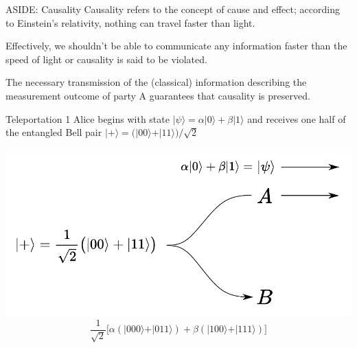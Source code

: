 \documentclass[11pt]{beamer}
\begin{document}
\begin{frame}{{\small ASIDE:} Causality}
Causality refers to the concept of cause and effect; according to Einstein's relativity, nothing can travel faster than light.\pause

\vspace{1cm}

Effectively, we shouldn't be able to communicate any information faster than the speed of light or causality is said to be violated. \pause

\vspace{1cm}

The necessary transmission of the (classical) information describing the measurement outcome of party A guarantees that causality is preserved.
\end{frame}

\begin{frame}{Teleportation 1}
Alice begins with state $\vert\psi\rangle = \alpha \vert 0\rangle + \beta\vert 1 \rangle$ and receives one half of the entangled Bell pair $\vert +\rangle=\big(\vert 00\rangle + \vert 11\rangle\big)/\sqrt{2}$

\vspace{0.5cm}

\begin{center}
\includegraphics[scale=0.6]{tele1.pdf}
$$
\frac{1}{\sqrt{2}}\big[ \alpha(\vert 000\rangle+\vert 011\rangle) + \beta (\vert 100\rangle + \vert 111\rangle) \big]
$$
\end{center}

\end{frame}
\end{document}
